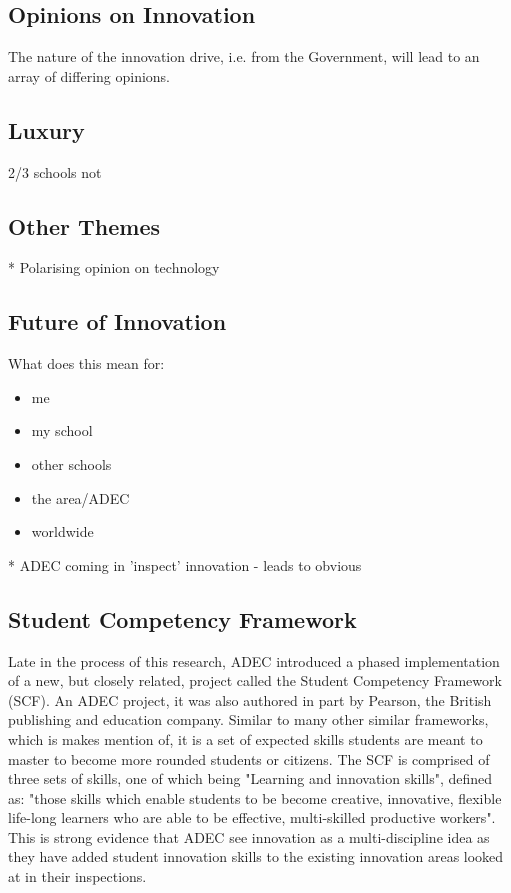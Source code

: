 \subsection{Opinions on Innovation}

The nature of the innovation drive, i.e. from the Government, will lead to an array of differing opinions.

\subsection{Luxury}
2/3 schools not \cite{ADEC2016 pi.3}

\subsection{Other Themes}
* Polarising opinion on technology

\subsection{Future of Innovation}


What does this mean for:
\begin{itemize}
\item me
\item my school
\item other schools
\item the area/ADEC
\item worldwide
\end{itemize}
* ADEC coming in 'inspect' innovation - leads to obvious
\subsection{Student Competency Framework}

Late in the process of this research, ADEC introduced a phased implementation of a new, but closely related, project called the Student Competency Framework (SCF). An ADEC project, it was also authored in part by Pearson, the British publishing and education company. Similar to many other similar frameworks, which is makes mention of, it is a set of expected skills students are meant to master to become more rounded students or citizens. The SCF is comprised of three sets of skills, one of which being "Learning and innovation skills", defined as: "those skills which enable students to be become creative, innovative, flexible life-long learners who are able to be effective, multi-skilled productive workers". This is strong evidence that ADEC see innovation as a multi-discipline idea as they have added student innovation skills to the existing innovation areas looked at in their inspections.

